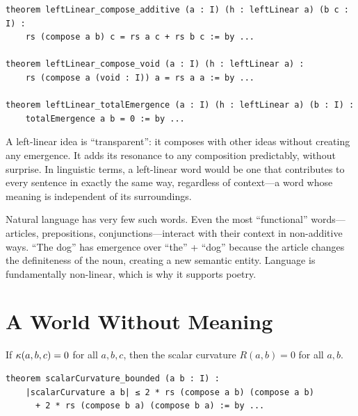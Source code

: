 \begin{lstlisting}[caption={Linear composition (IDT\_v3\_Emergence.lean)}]
theorem leftLinear_compose_additive (a : I) (h : leftLinear a) (b c : I) :
    rs (compose a b) c = rs a c + rs b c := by ...

theorem leftLinear_compose_void (a : I) (h : leftLinear a) :
    rs (compose a (void : I)) a = rs a a := by ...

theorem leftLinear_totalEmergence (a : I) (h : leftLinear a) (b : I) :
    totalEmergence a b = 0 := by ...
\end{lstlisting}

\begin{interpretation}
A left-linear idea is ``transparent'': it composes with other ideas without
creating any emergence. It adds its resonance to any composition predictably,
without surprise. In linguistic terms, a left-linear word would be one that
contributes to every sentence in exactly the same way, regardless of context---a
word whose meaning is independent of its surroundings.

Natural language has very few such words. Even the most ``functional'' words---articles,
prepositions, conjunctions---interact with their context in non-additive ways.
``The dog'' has emergence over ``the'' + ``dog'' because the article changes
the definiteness of the noun, creating a new semantic entity. Language is
fundamentally non-linear, which is why it supports poetry.
\end{interpretation}


\section{A World Without Meaning}

\begin{theorem}
\label{thm:zero-emergence-zero-curvature}
If $\kappa(a,b,c) = 0$ for all $a, b, c$, then the scalar curvature
$R(a,b) = 0$ for all $a, b$.
\end{theorem}

\begin{lstlisting}[caption={Scalar curvature bounds (IDT\_v3\_Emergence.lean)}]
theorem scalarCurvature_bounded (a b : I) :
    |scalarCurvature a b| ≤ 2 * rs (compose a b) (compose a b)
      + 2 * rs (compose b a) (compose b a) := by ...
\end{lstlisting}


